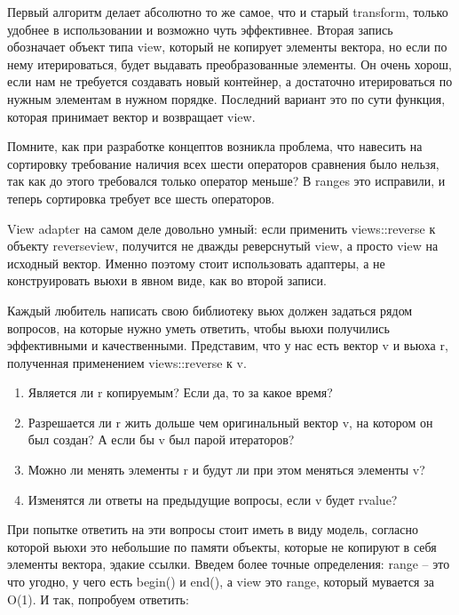 \documentclass[12pt, a4paper]{article}
\begin{document}
Первый алгоритм делает абсолютно то же самое, что и старый transform, только удобнее в использовании и возможно чуть эффективнее. Вторая запись обозначает объект типа view, который не копирует элементы вектора, но если по нему итерироваться, будет выдавать преобразованные элементы. Он очень хорош, если нам не требуется создавать новый контейнер, а достаточно итерироваться по нужным элементам в нужном порядке. Последний вариант это по сути функция, которая принимает вектор и возвращает view.
\par Помните, как при разработке концептов возникла проблема, что навесить на сортировку требование наличия всех шести операторов сравнения было нельзя, так как до этого требовался только оператор меньше? В ranges это исправили, и теперь сортировка требует все шесть операторов.
\par View adapter на самом деле довольно умный: если применить views::reverse к объекту reverse\textunderscore view, получится не дважды реверснутый view, а просто view на исходный вектор. Именно поэтому стоит использовать адаптеры, а не конструировать вьюхи в явном виде, как во второй записи.\\
\par Каждый любитель написать свою библиотеку вьюх должен задаться рядом вопросов, на которые нужно уметь ответить, чтобы вьюхи получились эффективными и качественными. Представим, что у нас есть вектор v и вьюха r, полученная применением views::reverse к v. 
\begin{enumerate}
	\item Является ли r копируемым? Если да, то за какое время?
	\item Разрешается ли r жить дольше чем оригинальный вектор v, на котором он был создан? А если бы v был парой итераторов?
	\item Можно ли менять элементы r и будут ли при этом меняться элементы v?
	\item Изменятся ли ответы на предыдущие вопросы, если v будет rvalue?
\end{enumerate}
При попытке ответить на эти вопросы стоит иметь в виду модель, согласно которой вьюхи это небольшие по памяти объекты, которые не копируют в себя элементы вектора, эдакие ссылки. Введем более точные определения: range -- это что угодно, у чего есть begin() и end(), а view это range, который мувается за O(1). И так, попробуем ответить:
\end{document}
